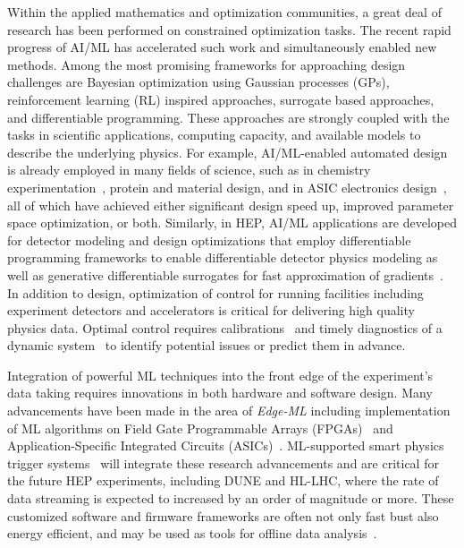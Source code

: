 \documentclass[submission,Phys]{SciPost}
\begin{document}
Within the applied mathematics and optimization communities, a great deal of research has been performed on constrained optimization tasks. The recent rapid progress of AI/ML has accelerated such work and simultaneously enabled new methods. Among the most promising frameworks for approaching  design challenges are Bayesian optimization using Gaussian processes (GPs), reinforcement learning (RL) inspired approaches, surrogate based approaches, and differentiable programming. These approaches are strongly coupled with the tasks in scientific applications, computing capacity, and available models to describe the underlying physics. For example, AI/ML-enabled automated design is already employed in many fields of science, such as in chemistry experimentation~\cite{Shen_2021}, protein and material design, and in ASIC electronics design~\cite{10.1038/s41586-021-03544-w}, all of which have achieved either significant design speed up, improved parameter space optimization, or both. Similarly, in HEP, AI/ML applications are developed for detector modeling and design optimizations that employ differentiable programming frameworks to enable differentiable detector physics modeling as well as generative differentiable surrogates for fast approximation of gradients~\cite{Dorigo:2022gqm,NEURIPS2020_a878dbeb,Diefenbacher:2020rna,Paganini:2017dwg,Paganini:2017hrr}. In addition to design, optimization of control for running facilities including experiment detectors and accelerators is critical for delivering high quality physics data. Optimal control requires calibrations~\cite{Cukierman:2016dkb,Baldi:2020hjm,Cheong:2019upg} and timely diagnostics of a dynamic system~\cite{Scheinker:2022iny} to identify potential issues or predict them in advance. 


Integration of powerful ML techniques into the front edge of the experiment's data taking requires innovations in both hardware and software design. Many advancements have been made in the area of {\it Edge-ML} including implementation of ML algorithms on Field Gate Programmable Arrays (FPGAs)~\cite{Govorkova:2021utb,Migliorini:2021fuj,Hong:2021snb,Aarrestad:2021zos,Heintz:2020soy,Iiyama:2020wap,Duarte:2018ite,DiGuglielmo:2020eqx,Summers:2020xiy} and Application-Specific Integrated Circuits (ASICs)~\cite{DiGuglielmo:2021ide}. ML-supported smart physics trigger systems~\cite{Bartoldus:2022zlc} will integrate these research advancements and are critical for the future HEP experiments, including DUNE and HL-LHC, where the rate of data streaming is expected to increased by an order of magnitude or more. These customized software and firmware frameworks are often not only fast bust also energy efficient, and may be used as tools for offline data analysis~\cite{Rankin:2020usv}. 
\end{document}
